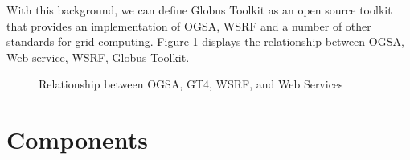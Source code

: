 \documentclass[9pt,twocolumn,twoside]{styles/osajnl}
\begin{document}
With this background, we can define Globus Toolkit as an open source toolkit that provides an implementation of OGSA, WSRF and a number of other standards for grid computing. Figure \ref{fig:relation} displays the relationship between OGSA, Web service, WSRF, Globus Toolkit.
\begin{figure}[htbp]
\centering
{}
\caption{Relationship between OGSA, GT4, WSRF, and Web Services \cite{sotomayor2006globus}}
\label{fig:relation}
\end{figure}

\section{Components} 
\end{document}
